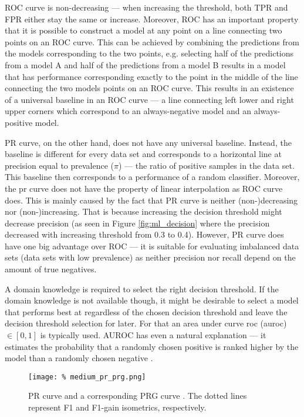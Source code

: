 ROC curve is non-decreasing --- when increasing the threshold, both TPR and FPR either stay the same or increase.
Moreover, ROC has an important property that it is possible to construct a model at any point on a line connecting two points on an ROC curve.
This can be achieved by combining the predictions from the models corresponding to the two points, e.g. selecting half of the predictions from a model A and half of the predictions from a model B results in a model that has performance corresponding exactly to the point in the middle of the line connecting the two models points on an ROC curve.
This results in an existence of a universal baseline in an ROC curve --- a line connecting left lower and right upper corners which correspond to an always-negative model and an always-positive model.

PR curve, on the other hand, does not have any universal baseline.
Instead, the baseline is different for every data set and corresponds to a horizontal line at precision equal to prevalence ($\pi$) --- the ratio of positive samples in the data set.
This baseline then corresponds to a performance of a random classifier.
Moreover, the \acrshort{pr} curve does not have the property of linear interpolation as ROC curve does.
This is mainly caused by the fact that PR curve is neither (non-)decreasing nor (non-)increasing.
That is because increasing the decision threshold might decrease precision (as seen in Figure \ref{fig:ml_decision} where the precision decreased with increasing threshold from 0.3 to 0.4).
However, PR curve does have one big advantage over ROC --- it is suitable for evaluating imbalanced data sets (data sets with low prevalence) as neither precision nor recall depend on the amount of true negatives.

A domain knowledge is required to select the right decision threshold.
If the domain knowledge is not available though, it might be desirable to select a model that performs best at regardless of the chosen decision threshold and leave the decision threshold selection for later.
For that an area under curve \acrshort{roc} (\acrshort{auroc}) $\in [0, 1]$ is typically used.
AUROC has even a natural explanation --- it estimates the probability that a randomly chosen positive is ranked higher by the model than a randomly chosen negative \cite{hand2001simple}.

\begin{figure}
    \texttt{[image: \%
        medium\_pr\_prg.png]}
    \caption{PR curve and a corresponding PRG curve \cite{flach2015precision}. The dotted lines represent F1 and F1-gain isometrics, respectively.}
    \label{fig:ml_pr_prg}
    \centering
\end{figure}

